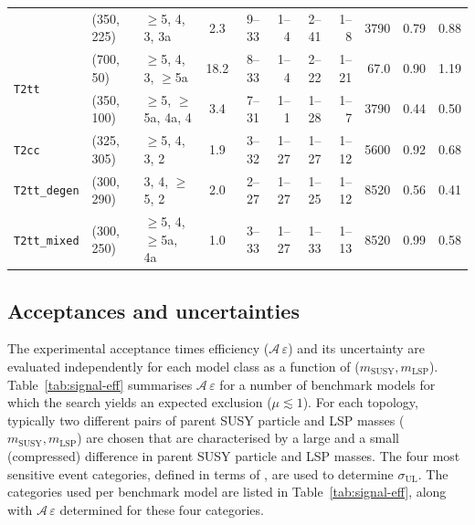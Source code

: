 \begin{table}[!t]
{\begin{tabular}{ lllcrrrrrcc }
    & (350, 225)  & $\geq$5, 4, 3, 3a        & \phantom{1}2.3  & 9--33  & 1--4     & 2--41  & 1--8  & 3790 & 0.79 & 0.88 \\ [0.5ex]
      \multirow{2}{*}{\texttt{T2tt}}                      
    & (700, 50)   & $\geq$5, 4, 3, $\geq$5a  & \phantom{1}18.2 & 8--33  & 1--4     & 2--22  & 1--21 & 67.0 & 0.90 & 1.19 \\
    & (350, 100)  & $\geq$5, $\geq$5a, 4a, 4 & \phantom{1}3.4  & 7--31  & 1--1     & 1--28  & 1--7  & 3790 & 0.44 & 0.50 \\ [0.5ex]
      \multirow{1}{*}{\texttt{T2cc}}                      
    & (325, 305)  & $\geq$5, 4, 3, 2         & \phantom{1}1.9  & 3--32  & 1--27    & 1--27  & 1--12 & 5600 & 0.92 & 0.68 \\ [0.5ex]
      \multirow{1}{*}{\texttt{T2tt\_degen}}               
    & (300, 290)  & 3, 4, $\geq$5, 2         & \phantom{1}2.0  & 2--27  & 1--27    & 1--25  & 1--12 & 8520 & 0.56 & 0.41 \\ [0.5ex]
      \multirow{1}{*}{\texttt{T2tt\_mixed}}               
    & (300, 250)  & $\geq$5, 4, $\geq$5a, 4a & \phantom{1}1.0  & 3--33  & 1--27    & 1--33  & 1--13 & 8520 & 0.99 & 0.58 \\ [0.5ex]
      \hline
    \end{tabular}
  }
\end{table}

\subsection{Acceptances and uncertainties}

The experimental acceptance times efficiency
($\mathcal{A}\,\varepsilon$) and its uncertainty are evaluated
independently for each model class as a function of ($m_\text{SUSY},
m_\text{LSP}$). Table~\ref{tab:signal-eff} summarises
$\mathcal{A}\,\varepsilon$ for a number of benchmark models for
which the search yields an expected exclusion ($\mu \lesssim 1$). For
each topology, typically two different pairs of parent SUSY particle and
LSP masses ($m_\text{SUSY}, m_\text{LSP}$) are chosen that are
characterised by a large and a small (\ie compressed) difference
in parent SUSY particle and LSP masses. The four most sensitive event
categories, defined in terms of \njet, are used to determine
$\sigma_\text{UL}$. The categories used per benchmark model are listed
in Table~\ref{tab:signal-eff}, along with
$\mathcal{A}\,\varepsilon$ determined for these four categories.


